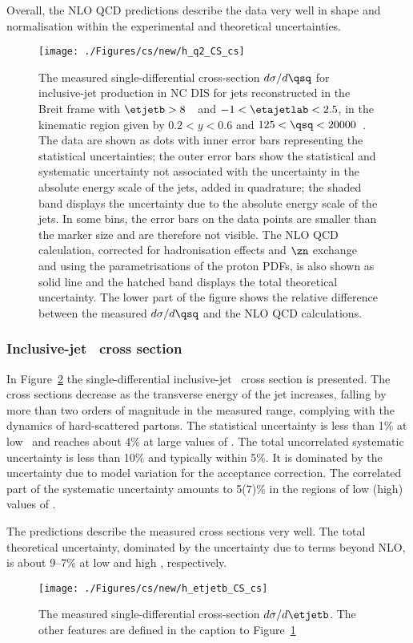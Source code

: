 Overall, the NLO QCD predictions describe the data very well in shape and normalisation within the experimental and theoretical uncertainties.
\begin{figure}[p]
	\centering
		\texttt{[image: ./Figures/cs/new/h\_q2\_CS\_cs]}
	\caption{The measured single-differential cross-section $d\sigma/d\qsq$ for inclusive-jet production in NC DIS for jets reconstructed in the Breit frame with $\etjetb > 8$~\GeV~and $-1<\etajetlab<2.5$, in the kinematic region given by $0.2<y<0.6$ and $125 < \qsq < 20000$~\GeV. The data are shown as dots with inner error bars representing the statistical uncertainties; the outer error bars show the statistical and systematic uncertainty not associated with the uncertainty in the absolute energy scale of the jets, added in quadrature; the shaded band displays the uncertainty due to the absolute energy scale of the jets. In some bins, the error bars on the data points are smaller than the marker size and are therefore not visible. The NLO QCD calculation, corrected for hadronisation effects and $\zn$ exchange and using the  parametrisations of the proton PDFs, is also shown as solid line and the hatched band displays the total theoretical uncertainty. The lower part of the figure shows the relative difference between the measured $d\sigma/d\qsq$ and the NLO QCD calculations.} 
	\label{fig:inclusivesingledif_q2}
\end{figure}

\subsubsection*{Inclusive-jet \dsdetjetb~cross section}
In Figure~\ref{fig:inclusivesingledif_et} the single-differential inclusive-jet \dsdetjetb~cross section is presented. The cross sections decrease as the transverse energy of the jet increases, falling by more than two orders of magnitude in the measured range, complying with the dynamics of hard-scattered partons. The statistical uncertainty is less than 1\% at low \etjetb~and reaches about 4\% at large values of \etjetb. The total uncorrelated systematic uncertainty is less than 10\% and typically within 5\%. It is dominated by the uncertainty due to model variation for the acceptance correction. The correlated part of the systematic uncertainty amounts to 5(7)\%  in the regions of low (high) values of \etjetb.

The predictions describe the measured cross sections very well. The total theoretical uncertainty, dominated by the uncertainty due to terms beyond NLO, is about 9--7\% at low and high \etjetb, respectively. 
\begin{figure}[p]
	\centering
		\texttt{[image: ./Figures/cs/new/h\_etjetb\_CS\_cs]}
	\caption{The measured single-differential cross-section $d\sigma/d\etjetb$. The other features are defined in the caption to Figure~\ref{fig:inclusivesingledif_q2}}
	\label{fig:inclusivesingledif_et}
\end{figure}

